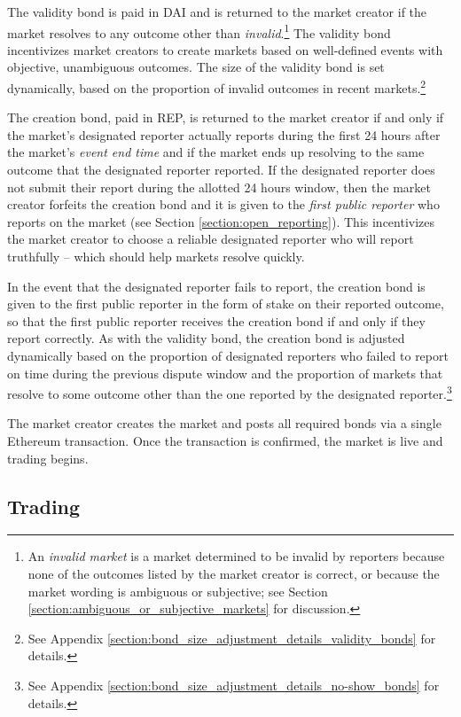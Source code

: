 \documentclass[floatfix,reprint,nofootinbib,amsmath,amssymb,epsfig,pre,floats,letterpaper,groupedaffiliation]{revtex4-1}
\theoremstyle{definition}
\theoremstyle{definition}
\begin{document}
The validity bond is paid in DAI and is returned to the market creator if the market resolves to any outcome other than \textit{invalid}.\footnote{An \textit{invalid market} is a market determined to be invalid by reporters because none of the outcomes listed by the market creator is correct, or because the market wording is ambiguous or subjective; see Section \ref{section:ambiguous_or_subjective_markets} for discussion.}  The validity bond incentivizes market creators to create markets based on well-defined events with objective, unambiguous outcomes.  The size of the validity bond is set dynamically, based on the proportion of invalid outcomes in recent markets.\footnote{See Appendix \ref{section:bond_size_adjustment_details_validity_bonds} for details.}

The creation bond, paid in REP, is returned to the market creator if and only if the market's designated reporter actually reports during the first 24 hours after the market's \textit{event end time} and if the market ends up resolving to the same outcome that the designated reporter reported. If the designated reporter does not submit their report during the allotted 24 hours window, then the market creator forfeits the creation bond and it is given to the \textit{first public reporter} who reports on the market (see Section \ref{section:open_reporting}).  This incentivizes the market creator to choose a reliable designated reporter who will report truthfully -- which should help markets resolve quickly.

In the event that the designated reporter fails to report, the creation bond is given to the first public reporter in the form of stake on their reported outcome, so that the first public reporter receives the creation bond if and only if they report correctly.  As with the validity bond, the creation bond is adjusted dynamically based on the proportion of designated reporters who failed to report on time during the previous dispute window and the proportion of markets that resolve to some outcome other than the one reported by the designated reporter.\footnote{See Appendix \ref{section:bond_size_adjustment_details_no-show_bonds} for details.}

The market creator creates the market and posts all required bonds via a single Ethereum transaction.  Once the transaction is confirmed, the market is live and trading begins.

\subsection{Trading}
\end{document}
